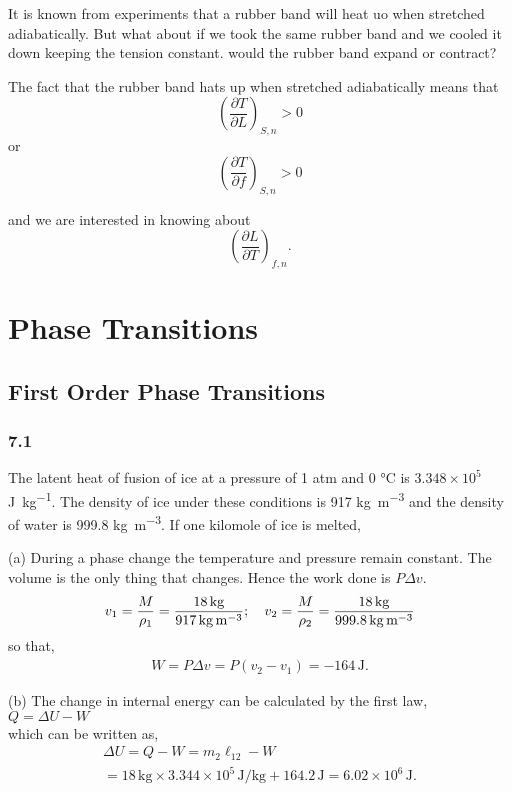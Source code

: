 \documentclass[10pt,twoside,openright]{memoir}
\begin{document}
It is known from experiments that a rubber band will heat uo when stretched adiabatically. But what about if we took the same rubber band and we cooled it down keeping the tension constant. would the rubber band expand or contract?

The fact that the rubber band hats up when stretched adiabatically means that 
$$
\left( \frac{\partial T}{\partial L} \right)_{S,n} > 0
$$
or
$$
\left( \frac{\partial T}{\partial f} \right)_{S,n} > 0
$$

and we are interested in knowing about 
$$
\left( \frac{\partial L}{\partial T} \right)_{f,n}.
$$



\chapter{Phase Transitions}
\section{\label{sec:level1} First Order Phase Transitions}
\subsection{7.1}
The latent heat of fusion of ice at a pressure of 1 atm and 0 \si{\degreeCelsius} is $3.348 \times10^{5}$ \si{\joule\per\kilogram}. The density of ice under these conditions is 917 \si{\kilo\gram\per\meter\cubed} and the density of water is 999.8 \si{\kilogram\per\meter\cubed}. If one kilomole of ice is melted,

(a) During a phase change the temperature and pressure remain constant. The volume is the only thing that changes. Hence the work done is $P\Delta v$. \\
\begin{equation}
v_{1}=\frac{M}{\rho_{1}} = \frac{18 \, \si{\kilogram}}{917  \, \si{\kilogram\per\meter\cubed}}; \quad
v_{2}=\frac{M}{\rho_{2}} = \frac{18 \, \si{\kilogram}}{999.8  \, \si{\kilogram\per\meter\cubed}} \\
\end{equation}
so that,\\
\begin{align}
W= P \Delta v = P(v_{2} - v_{1}) = -164 \, \si{\joule}.
\end{align}

(b) The change in internal energy can be calculated by the first law, $Q = \Delta U - W$ \\
which can be written as, \\
\begin{equation}
\begin{split}
\Delta U = Q - W = m_{2} \ell_{12} - W \\
 = 18 \, \si{\kilogram} \times 3.344 \times 10^{5} \, \si{\joule\per\kilogram} + 164.2 \, \si{\joule} = 6.02 \times 10^{6} \, \si{\joule}.
\end{split}
\end{equation}
\end{document}

